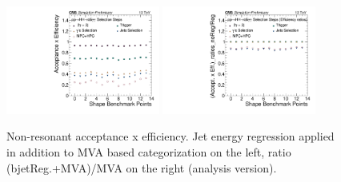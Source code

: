 \begin{figure}[thb]
  \centering
  \includegraphics[width=0.45\textwidth]{figures/sec-efficiency_plots/wRegression/nonres_effs_reg.pdf}\hfil
  \includegraphics[width=0.45\textwidth]{figures/sec-efficiency_plots/wRegression/nonres_effs_reg_Ratio_MVAHHTagger_reg.pdf}\hfil
  \caption{Non-resonant acceptance x efficiency. Jet energy regression applied in addition to MVA based categorization on the left, ratio (bjetReg.+MVA)/MVA on the right (analysis version).}
  \label{fig:cutflow-signal-NR-wRegression}
\end{figure}


